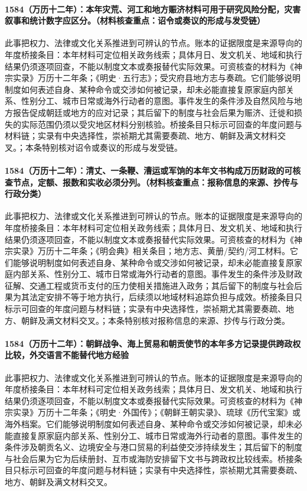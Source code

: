 \paragraph{1584（万历十二年）：本年灾荒、河工和地方赈济材料可用于研究风险分配，灾害叙事和统计数字应区分。（材料核查重点：诏令或奏议的形成与发受链）} 此事把权力、法律或文化关系推进到可辨认的节点。账本的证据限度是来源导向的年度桥接条目：本年材料可定位相关政务线索；具体月日、发文机关、地域和执行结果仍须逐项回查，不能以制度文本或奏报替代实际效果。可资核查的材料为《神宗实录》万历十二年条；《明史·五行志》；受灾府县地方志与奏疏。它们能够说明制度如何表述自身、某种命令或交涉如何被记录，却未必能直接复原家庭内部关系、性别分工、城市日常或海外行动者的意图。事件发生的条件涉及自然风险与地方报告促成朝廷或地方的应对记录；其后留下的制度与社会后果为赈济、迁徙和损失的实际范围仍须以受灾地区材料分别核验。桥接条目只标示可回查的年度问题与材料链；实录有中央选择性，崇祯期尤其需要奏疏、地方、朝鲜及满文材料交叉。；本条特别核对诏令或奏议的形成与发受链。

\paragraph{1584（万历十二年）：清丈、一条鞭、漕运或军饷的本年文书构成万历财政的可核查节点，定额、报数和实收必须分列。（材料核查重点：报称信息的来源、抄传与行政分类）} 此事把权力、法律或文化关系推进到可辨认的节点。账本的证据限度是来源导向的年度桥接条目：本年材料可定位相关政务线索；具体月日、发文机关、地域和执行结果仍须逐项回查，不能以制度文本或奏报替代实际效果。可资核查的材料为《神宗实录》万历十二年条；《明会典》相关条目；地方志、黄册/契约/河工材料。它们能够说明制度如何表述自身、某种命令或交涉如何被记录，却未必能直接复原家庭内部关系、性别分工、城市日常或海外行动者的意图。事件发生的条件涉及财政征解、交通工程或货币支付的压力使相关措施进入政务；其后留下的制度与社会后果为其法定安排不等于地方执行，后续须以地域材料追踪负担与成效。桥接条目只标示可回查的年度问题与材料链；实录有中央选择性，崇祯期尤其需要奏疏、地方、朝鲜及满文材料交叉。；本条特别核对报称信息的来源、抄传与行政分类。

\paragraph{1584（万历十二年）：朝鲜战争、海上贸易和朝贡使节的本年多方记录提供跨政权比较，外交语言不能替代地方经验} 此事把权力、法律或文化关系推进到可辨认的节点。账本的证据限度是来源导向的年度桥接条目：本年材料可定位相关政务线索；具体月日、发文机关、地域和执行结果仍须逐项回查，不能以制度文本或奏报替代实际效果。可资核查的材料为《神宗实录》万历十二年条；《明史·外国传》；《朝鲜王朝实录》、琉球《历代宝案》或海外档案。它们能够说明制度如何表述自身、某种命令或交涉如何被记录，却未必能直接复原家庭内部关系、性别分工、城市日常或海外行动者的意图。事件发生的条件涉及朝贡名义、边境安全与港口贸易的利益使交涉持续发生；其后留下的制度与社会后果为它为后续册封、互市或海防安排留下文书与跨政权比较线索。桥接条目只标示可回查的年度问题与材料链；实录有中央选择性，崇祯期尤其需要奏疏、地方、朝鲜及满文材料交叉。

